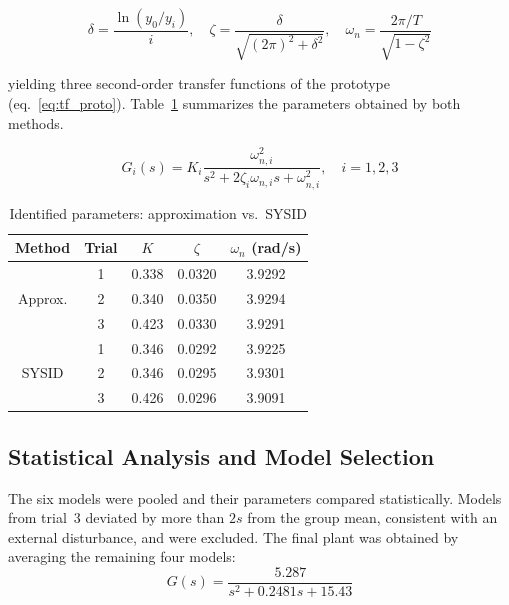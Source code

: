 \documentclass[conference]{IEEEtran}
\begin{document}
\begin{equation}
  \delta = \frac{\ln(y_0/y_i)}{i}, \quad
  \zeta  = \frac{\delta}{\sqrt{(2\pi)^2+\delta^2}}, \quad
  \omega_n = \frac{2\pi/T}{\sqrt{1-\zeta^2}}
  \label{eq:approx}
\end{equation}

yielding three second-order transfer functions of the
prototype (eq.~\ref{eq:tf_proto}). Table~\ref{tab:params}
summarizes the parameters obtained by both methods.

\begin{equation}
  G_i(s) = K_i\frac{\omega_{n,i}^2}{s^2+2\zeta_i
  \omega_{n,i}s+\omega_{n,i}^2}, \quad i=1,2,3
  \label{eq:tf_proto}
\end{equation}

\begin{table}[h]
  \centering
  \caption{Identified parameters: approximation vs.\ SYSID}
  \begin{tabular}{ccccc}
    \toprule
    Method & Trial & $K$ & $\zeta$ & $\omega_n$ (rad/s) \\
    \midrule
    \multirow{3}{*}{Approx.}
      & 1 & 0.338 & 0.0320 & 3.9292 \\
      & 2 & 0.340 & 0.0350 & 3.9294 \\
      & 3 & 0.423 & 0.0330 & 3.9291 \\
    \midrule
    \multirow{3}{*}{SYSID}
      & 1 & 0.346 & 0.0292 & 3.9225 \\
      & 2 & 0.346 & 0.0295 & 3.9301 \\
      & 3 & 0.426 & 0.0296 & 3.9091 \\
    \bottomrule
  \end{tabular}
  \label{tab:params}
\end{table}


\subsection{Statistical Analysis and Model Selection}
The six models were pooled and their parameters
compared statistically. Models from trial~3 deviated
by more than $2s$ from the group mean, consistent
with an external disturbance, and were excluded.
The final plant was obtained by averaging the
remaining four models:
\begin{equation}
G(s) = \frac{5.287}{s^2 + 0.2481s + 15.43}
\label{eq:plant}
\end{equation}
\end{document}
